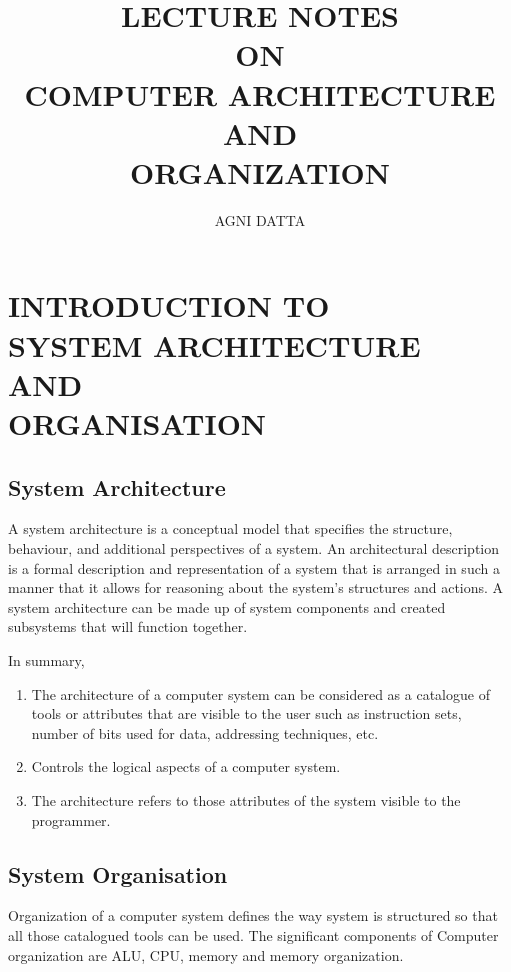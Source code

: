 \documentclass[10pt,british]{report}
\begin{document}
\title{\noindent \textbf{LECTURE NOTES\\ON\\COMPUTER ARCHITECTURE\\AND\\ORGANIZATION}}
\author{\noindent AGNI DATTA}

\maketitle
\noindent \tableofcontents{}

\chapter{INTRODUCTION TO\\SYSTEM ARCHITECTURE\\AND\\ORGANISATION}

\section{System Architecture}

\noindent A system architecture is a conceptual model that specifies
the structure, behaviour, and additional perspectives of a system.
An architectural description is a formal description and representation
of a system that is arranged in such a manner that it allows for reasoning
about the system's structures and actions. A system architecture can
be made up of system components and created subsystems that will function
together.

\noindent In summary,
\begin{enumerate}
	\item The architecture of a computer system can be considered as a catalogue
	      of tools or attributes that are visible to the user such as instruction
	      sets, number of bits used for data, addressing techniques, etc.
	\item Controls the logical aspects of a computer system.
	\item The architecture refers to those attributes of the system visible
	      to the programmer.
\end{enumerate}

\section{System Organisation}

\noindent Organization of a computer system defines the way system
is structured so that all those catalogued tools can be used. The
significant components of Computer organization are ALU, CPU, memory
and memory organization.
\end{document}
